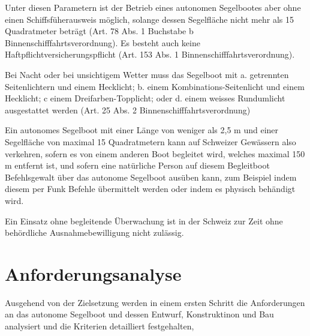 Unter diesen Parametern ist der Betrieb eines autonomen Segelbootes aber ohne einen Schiffsfüherausweis möglich, solange dessen Segelfläche nicht mehr als 15 Quadratmeter beträgt (Art. 78 Abs. 1 Buchstabe b Binnenschifffahrtsverordnung). Es besteht auch keine Haftpflichtversicherungspflicht (Art. 153 Abs. 1 Binnenschifffahrtsverordnung). 

Bei Nacht oder bei unsichtigem Wetter muss das Segelboot mit a. getrennten Seitenlichtern und einem Hecklicht; b. einem Kombinations-Seitenlicht und einem Hecklicht; c einem Dreifarben-Topplicht; oder
d. einem weisses Rundumlicht ausgestattet werden (Art. 25 Abs. 2 Binnenschifffahrtsverordnung)

Ein autonomes Segelboot mit einer Länge von weniger als 2,5 m und einer Segelfläche von maximal 15 Quadratmetern kann auf Schweizer Gewässern also verkehren, sofern es von einem anderen Boot begleitet wird, welches maximal 150 m entfernt ist, und sofern eine natürliche Person auf diesem Begleitboot Befehlsgewalt über das autonome Segelboot ausüben kann, zum Beispiel indem diesem per Funk Befehle übermittelt werden oder indem es physisch behändigt wird.

Ein Einsatz ohne begleitende Überwachung ist in der Schweiz zur Zeit ohne behördliche Ausnahmebewilligung nicht zulässig.
\section{Anforderungsanalyse}
Ausgehend von der Zielsetzung werden in einem ersten Schritt die Anforderungen an das autonome Segelboot und dessen Entwurf, Konstruktinon und Bau analysiert und die Kriterien detailliert festgehalten, 


